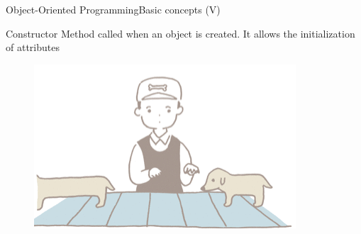 \documentclass[10pt,compress]{beamer} %
\begin{document}
\begin{frame}{Object-Oriented Programming}{Basic concepts (V)}
	\begin{block}{Constructor}
		 Method called when an object is created. It allows the initialization of attributes
  	\end{block}	
		\begin{figure}
			\includegraphics[scale=0.5]{figs/constructor}
		\end{figure}				
\end{frame}
\end{document}
